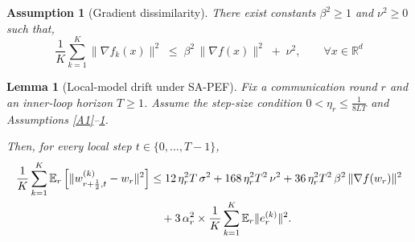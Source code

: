 \documentclass[10pt,a4paper]{amsart}
\newtheorem{assumption}{Assumption}
\newtheorem{lemma}{Lemma}
\newcommand{\E}{\mathbb{E}}
\begin{document}
\begin{assumption}[Gradient dissimilarity]\label{A3}
There exist constants $\beta^{2}\ge 1$ and $\nu^{2}\ge 0$ such that,
\[
\frac{1}{K}\sum_{k=1}^{K}\bigl\|\nabla f_k(x)\bigr\|^{2}
\;\le\;
\beta^{2}\,\bigl\|\nabla f(x)\bigr\|^{2} \;+\; \nu^{2},\qquad \forall x\in\mathbb R^{d}
\]
\end{assumption}

\begin{lemma}[Local-model drift under SA-PEF]      \label{lem:local-drift}
Fix a communication round \(r\) and an inner-loop horizon \(T\ge 1\).
Assume the step-size condition \(0 < \eta_r \le \frac{1}{8LT}\) and Assumptions \ref{A1}--\ref{A3}.

Then, for every local step \(t\in\{0,\dots,T-1\}\),
\begin{align}
\frac{1}{K} \sum_{k=1}^{K}
\mathbb{E}_r \left[
  \|w_{r+\frac12,t}^{(k)} - w_r\|^2
\right]
&\le
12\,\eta_r^{2}T\,\sigma^{2}
+168\,\eta_r^{2}T^{2}\,\nu^{2}
+36\,\eta_r^{2}T^{2}\,\beta^{2}\,\|\nabla f(w_r)\|^{2}\notag\\
&\quad
+3\,\alpha_r^{2}\times \frac{1}{K}\sum_{k=1}^{K}\E_r\|e_r^{(k)}\|^{2}.
\end{align}

\end{lemma}
\end{document}
